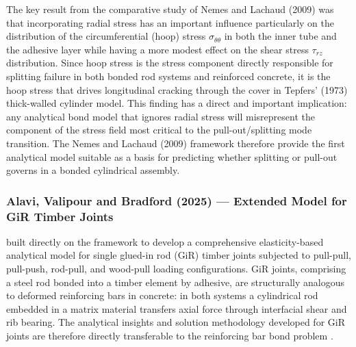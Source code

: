 The key result from the comparative study of Nemes and Lachaud (2009) was that incorporating radial stress has an important influence particularly on the distribution of the circumferential (hoop) stress ${\sigma }_{\theta \theta}$ in both the inner tube and the adhesive layer while having a more modest effect on the shear stress ${\tau }_{rz}$ distribution. Since hoop stress is the stress component directly responsible for splitting failure in both bonded rod systems and reinforced concrete, it is the hoop stress that drives longitudinal cracking through the cover in Tepfers' (1973) thick-walled cylinder model. This finding has a direct and important implication: any analytical bond model that ignores radial stress will misrepresent the component of the stress field most critical to the pull-out/splitting mode transition. The Nemes and Lachaud (2009) framework therefore provide the first analytical model suitable as a basis for predicting whether splitting or pull-out governs in a bonded cylindrical assembly.

\subsubsection{Alavi, Valipour and Bradford (2025) — Extended Model for GiR Timber Joints}

\textcite{alaviAnalyticalProcedureFailure2025} built directly on the \parencite{nemesModelingCylindricalAdhesively2009} framework to develop a comprehensive elasticity-based analytical model for single glued-in rod (GiR) timber joints subjected to pull-pull, pull-push, rod-pull, and wood-pull loading configurations. GiR joints, comprising a steel rod bonded into a timber element by adhesive, are structurally analogous to deformed reinforcing bars in concrete: in both systems a cylindrical rod embedded in a matrix material transfers axial force through interfacial shear and rib bearing. The analytical insights and solution methodology developed for GiR joints are therefore directly transferable to the reinforcing bar bond problem \parencite{alaviAnalyticalProcedureFailure2025}.

